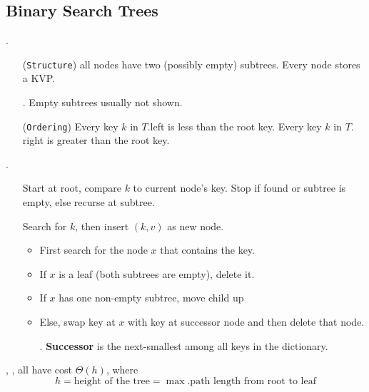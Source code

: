 \documentclass{article}
\begin{document}
\subsection{Binary Search Trees}

\begin{deff}.
    \begin{enumerate}
        \item[(\texttt{Structure})] all nodes have two (possibly empty) subtrees. Every node stores a KVP. 
        \begin{comm}[].
            Empty subtrees usually not shown. 
        \end{comm} 
        \item[(\texttt{Ordering})] Every key $k$ in $T.$left is less than the root key. Every key $k$ in $T.$right is greater than the root key.
    \end{enumerate}
\end{deff}

\begin{codes}[].
    \begin{enumerate}
        \item[\code{search(k)}] Start at root, compare $k$ to current node’s key. Stop if found or subtree is empty, else recurse at subtree. 
        \item[\code{insert(k, v)}] Search for $k$, then insert $(k, v)$ as new node. 
        \item[\code{delete(x)}] 
        \begin{itemize}
            \item First search for the node $x$ that contains the key. 
            \item If $x$ is a leaf (both subtrees are empty), delete it. 
            \item If $x$ has one non-empty subtree, move child up 
            \item Else, swap key at $x$ with key at successor node and then delete that node.
            \begin{deff}.
                \textbf{Successor} is the next-smallest among all keys in the dictionary.
            \end{deff}
        \end{itemize}
    \end{enumerate}
\end{codes}

\begin{tcolorbox}[colback=yellow!10!white,colframe=orange]
    , ,  all have cost $\Theta(h)$, where 
    \[ h = \text{height of the tree} = \max. \text{path length from root to leaf} \]
\end{tcolorbox}
\end{document}
